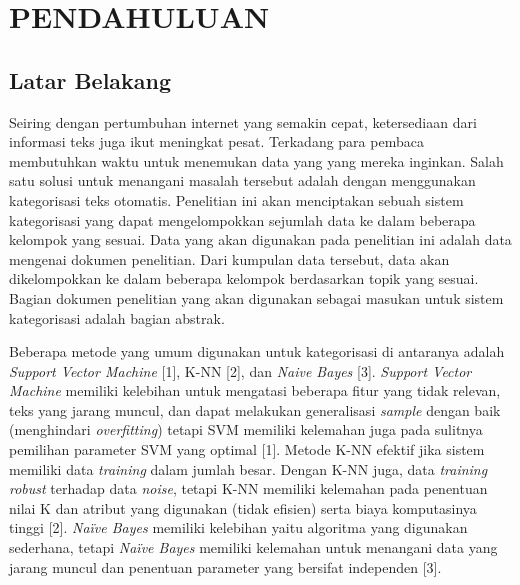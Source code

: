 \chapter{PENDAHULUAN}

\vspace{4.5pt}

\section{Latar Belakang} \label{sec:latar_belakang}
\indent
Seiring dengan pertumbuhan internet yang semakin cepat, ketersediaan dari informasi teks juga ikut meningkat pesat. Terkadang para pembaca membutuhkan waktu untuk menemukan data yang yang mereka inginkan. Salah satu solusi untuk menangani masalah tersebut adalah dengan menggunakan kategorisasi teks otomatis. Penelitian ini akan menciptakan sebuah sistem kategorisasi yang dapat mengelompokkan sejumlah data ke dalam beberapa kelompok yang sesuai. Data yang akan digunakan pada penelitian ini adalah data mengenai dokumen penelitian. Dari kumpulan data tersebut, data akan dikelompokkan ke dalam beberapa kelompok berdasarkan topik yang sesuai. Bagian dokumen penelitian yang akan digunakan sebagai masukan untuk sistem kategorisasi adalah bagian abstrak.

\indent
Beberapa metode yang umum digunakan untuk kategorisasi di antaranya adalah {\itshape Support Vector Machine} [1], K-NN [2], dan {\itshape Naive Bayes} [3]. {\itshape Support Vector Machine} memiliki kelebihan untuk mengatasi beberapa fitur yang tidak relevan, teks yang jarang muncul, dan dapat melakukan generalisasi {\itshape sample} dengan baik (menghindari {\itshape overfitting}) tetapi SVM memiliki kelemahan juga pada sulitnya pemilihan parameter SVM yang optimal [1]. Metode K-NN efektif jika sistem memiliki data {\itshape training} dalam jumlah besar. Dengan K-NN juga, data {\itshape training robust} terhadap data {\itshape noise}, tetapi K-NN memiliki kelemahan pada penentuan nilai K dan atribut yang digunakan (tidak efisien) serta biaya komputasinya tinggi [2]. {\itshape Naïve Bayes} memiliki kelebihan yaitu algoritma yang digunakan sederhana, tetapi {\itshape Naïve Bayes} memiliki kelemahan untuk menangani data yang jarang muncul dan penentuan parameter yang bersifat independen [3]. 

